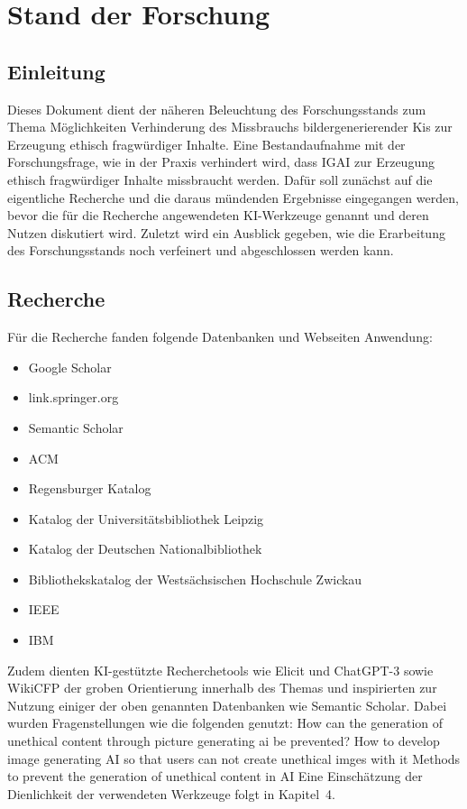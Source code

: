 \section{Stand der Forschung}
\subsection{Einleitung}

Dieses Dokument dient der näheren Beleuchtung des Forschungsstands zum Thema Möglichkeiten Verhinderung 
des Missbrauchs bildergenerierender Kis zur Erzeugung ethisch fragwürdiger Inhalte. Eine Bestandaufnahme 
mit der Forschungsfrage, wie in der Praxis verhindert wird, dass IGAI zur Erzeugung ethisch fragwürdiger 
Inhalte missbraucht werden. Dafür soll zunächst auf die eigentliche Recherche und die daraus mündenden 
Ergebnisse eingegangen werden, bevor die für die Recherche angewendeten KI-Werkzeuge genannt und deren 
Nutzen diskutiert wird. Zuletzt wird ein Ausblick gegeben, wie die Erarbeitung des Forschungsstands noch 
verfeinert und abgeschlossen werden kann.
\subsection{Recherche}
Für die Recherche fanden folgende Datenbanken und Webseiten Anwendung:
\begin{itemize}
    \item Google Scholar
    \item link.springer.org
    \item Semantic Scholar
    \item ACM
    \item Regensburger Katalog
    \item Katalog der Universitätsbibliothek Leipzig
    \item Katalog der Deutschen Nationalbibliothek
    \item Bibliothekskatalog der Westsächsischen Hochschule Zwickau
    \item IEEE
    \item IBM    
\end{itemize}

Zudem dienten KI-gestützte Recherchetools wie Elicit und ChatGPT-3 sowie WikiCFP der groben 
Orientierung innerhalb des Themas und inspirierten zur Nutzung einiger der oben genannten 
Datenbanken wie Semantic Scholar. Dabei wurden Fragenstellungen wie die folgenden genutzt:
How can the generation of unethical content through picture generating ai be prevented?
How to develop image generating AI so that users can not create unethical imges with it
Methods to prevent the generation of unethical content in AI
Eine Einschätzung der Dienlichkeit der verwendeten Werkzeuge folgt in Kapitel 4.
